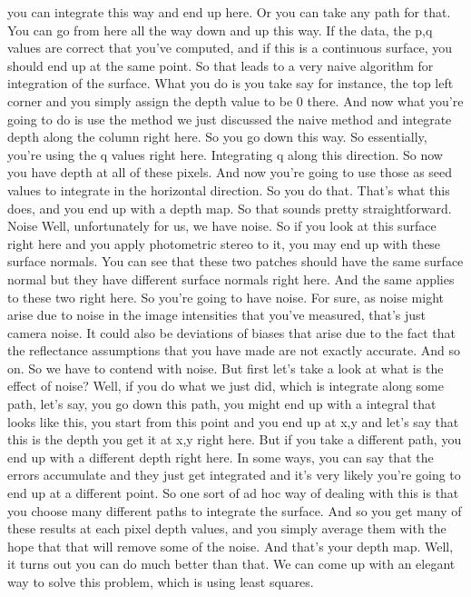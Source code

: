 \documentclass[12pt]{article}
\begin{document}
you can integrate this way and end up here.
Or you can take any path for that.
You can go from here all the way down and up this way.
If the data, the p,q values are correct that you've computed,
and if this is a continuous surface,
you should end up at the same point.
So that leads to a very naive algorithm
for integration of the surface.
What you do is you take say for instance, the top left corner
and you simply assign the depth value to be 0 there.
And now what you're going to do is
use the method we just discussed the naive method
and integrate depth along the column right here.
So you go down this way.
So essentially, you're using the q values right here.
Integrating q along this direction.
So now you have depth at all of these pixels.
And now you're going to use those as seed values
to integrate in the horizontal direction.
So you do that.
That's what this does, and you end up with a depth map.
So that sounds pretty straightforward.
Noise
Well, unfortunately for us, we have noise.
So if you look at this surface right here
and you apply photometric stereo to it,
you may end up with these surface normals.
You can see that these two patches should
have the same surface normal but they have different surface
normals right here.
And the same applies to these two right here.
So you're going to have noise.
For sure, as noise might arise due to noise in the image
intensities that you've measured,
that's just camera noise.
It could also be deviations of biases
that arise due to the fact that the reflectance assumptions
that you have made are not exactly accurate.
And so on.
So we have to contend with noise.
But first let's take a look at what is the effect of noise?
Well, if you do what we just did,
which is integrate along some path, let's say,
you go down this path, you might end up with a integral that
looks like this, you start from this point and you end up
at x,y and let's say that this is the depth you get it at x,y
right here.
But if you take a different path,
you end up with a different depth right here.
In some ways, you can say that the errors accumulate and they
just get integrated and it's very
likely you're going to end up at a different point.
So one sort of ad hoc way of dealing with this
is that you choose many different paths to integrate
the surface.
And so you get many of these results at each pixel depth
values, and you simply average them with the hope
that that will remove some of the noise.
And that's your depth map.
Well, it turns out you can do much better than that.
We can come up with an elegant way
to solve this problem, which is using least squares.
\end{document}
